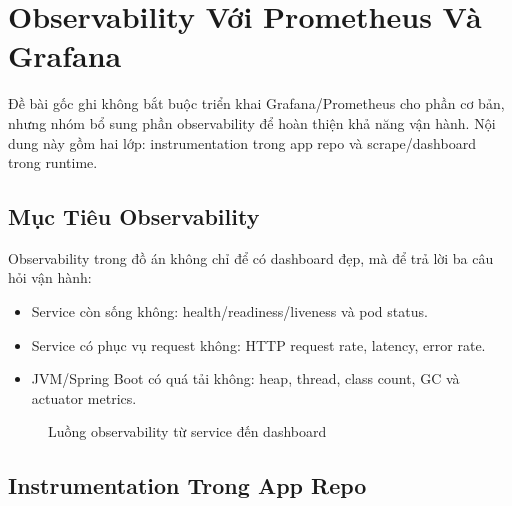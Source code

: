 \section{Observability Với Prometheus Và Grafana}

Đề bài gốc ghi không bắt buộc triển khai Grafana/Prometheus cho phần cơ bản, nhưng
nhóm bổ sung phần observability để hoàn thiện khả năng vận hành. Nội dung này gồm
hai lớp: instrumentation trong app repo và scrape/dashboard trong runtime.

\subsection{Mục Tiêu Observability}

Observability trong đồ án không chỉ để có dashboard đẹp, mà để trả lời ba câu hỏi
vận hành:

\begin{itemize}
    \item Service còn sống không: health/readiness/liveness và pod status.
    \item Service có phục vụ request không: HTTP request rate, latency, error rate.
    \item JVM/Spring Boot có quá tải không: heap, thread, class count, GC và actuator metrics.
\end{itemize}

\begin{figure}[H]
\centering
{}
\caption{Luồng observability từ service đến dashboard}
\end{figure}

\subsection{Instrumentation Trong App Repo}

